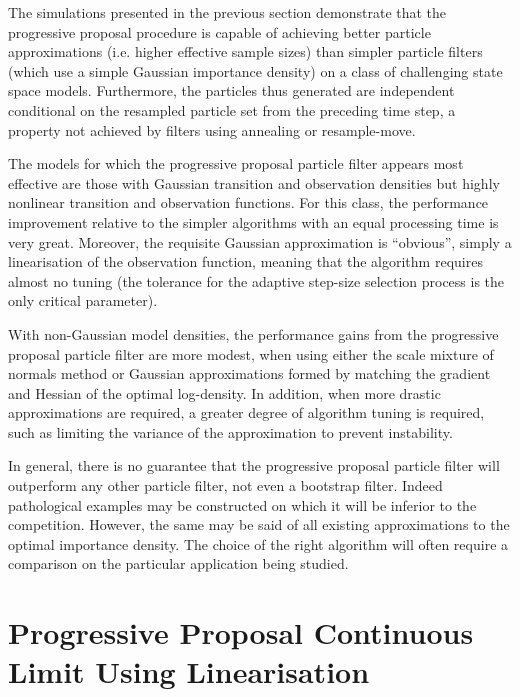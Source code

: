 \documentclass{article}
\begin{document}
The simulations presented in the previous section demonstrate that the progressive proposal procedure is capable of achieving better particle approximations (i.e. higher effective sample sizes) than simpler particle filters (which use a simple Gaussian importance density) on a class of challenging state space models. Furthermore, the particles thus generated are independent conditional on the resampled particle set from the preceding time step, a property not achieved by filters using annealing or resample-move.

The models for which the progressive proposal particle filter appears most effective are those with Gaussian transition and observation densities but highly nonlinear transition and observation functions. For this class, the performance improvement relative to the simpler algorithms with an equal processing time is very great. Moreover, the requisite Gaussian approximation is ``obvious'', simply a linearisation of the observation function, meaning that the algorithm requires almost no tuning (the tolerance for the adaptive step-size selection process is the only critical parameter).

With non-Gaussian model densities, the performance gains from the progressive proposal particle filter are more modest, when using either the scale mixture of normals method or Gaussian approximations formed by matching the gradient and Hessian of the optimal log-density. In addition, when more drastic approximations are required, a greater degree of algorithm tuning is required, such as limiting the variance of the approximation to prevent instability.

In general, there is no guarantee that the progressive proposal particle filter will outperform any other particle filter, not even a bootstrap filter. Indeed pathological examples may be constructed on which it will be inferior to the competition. However, the same may be said of all existing approximations to the optimal importance density. The choice of the right algorithm will often require a comparison on the particular application being studied.



\appendix


\section{Progressive Proposal Continuous Limit Using Linearisation} \label{app:continuous_limit_and_linearisation}
\end{document}
